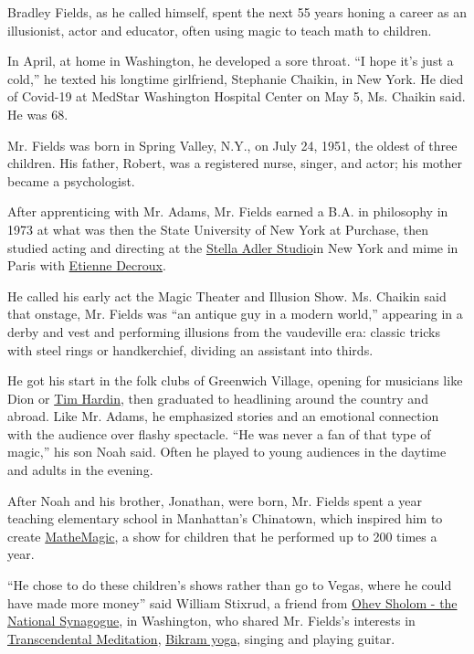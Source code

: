 Bradley Fields, as he called himself, spent the next 55 years honing a
career as an illusionist, actor and educator, often using magic to teach
math to children.

In April, at home in Washington, he developed a sore throat. ``I hope
it's just a cold,'' he texted his longtime girlfriend, Stephanie
Chaikin, in New York. He died of Covid-19 at MedStar Washington Hospital
Center on May 5, Ms. Chaikin said. He was 68.

Mr. Fields was born in Spring Valley, N.Y., on July 24, 1951, the oldest
of three children. His father, Robert, was a registered nurse, singer,
and actor; his mother became a psychologist.

After apprenticing with Mr. Adams, Mr. Fields earned a B.A. in
philosophy in 1973 at what was then the State University of New York at
Purchase, then studied acting and directing at the
\href{https://stellaadler.com/}{Stella Adler Studio}in New York and mime
in Paris with
\href{https://mimecorporel.com/etienne-decroux-and-corporeal-mime/}{Etienne
Decroux}.

He called his early act the Magic Theater and Illusion Show. Ms. Chaikin
said that onstage, Mr. Fields was ``an antique guy in a modern world,''
appearing in a derby and vest and performing illusions from the
vaudeville era: classic tricks with steel rings or handkerchief,
dividing an assistant into thirds.

He got his start in the folk clubs of Greenwich Village, opening for
musicians like Dion or
\href{https://www.rollingstone.com/music/music-news/tim-hardin-songwriter-dylan-once-called-the-greatest-set-for-revival-117002/}{Tim
Hardin}, then graduated to headlining around the country and abroad.
Like Mr. Adams, he emphasized stories and an emotional connection with
the audience over flashy spectacle. ``He was never a fan of that type of
magic,'' his son Noah said. Often he played to young audiences in the
daytime and adults in the evening.

After Noah and his brother, Jonathan, were born, Mr. Fields spent a year
teaching elementary school in Manhattan's Chinatown, which inspired him
to create \href{http://www.mathemagic.com/site/}{MatheMagic}, a show for
children that he performed up to 200 times a year.

``He chose to do these children's shows rather than go to Vegas, where
he could have made more money'' said William Stixrud, a friend from
\href{https://www.ostns.org/}{Ohev Sholom - the National Synagogue}, in
Washington, who shared Mr. Fields's interests in
\href{https://www.tm.org/}{Transcendental Meditation},
\href{https://bikramyoganyc.com/bikram/}{Bikram yoga}, singing and
playing guitar.

